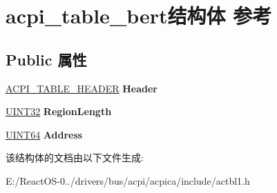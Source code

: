 \hypertarget{structacpi__table__bert}{}\section{acpi\+\_\+table\+\_\+bert结构体 参考}
\label{structacpi__table__bert}
\subsection*{Public 属性}
\begin{DoxyCompactItemize}
\item 
\mbox{\label{structacpi__table__bert_a7ca72bdbc62118d6dca4e513a1c2ba46}} 
\hyperlink{structacpi__table__header}{A\+C\+P\+I\+\_\+\+T\+A\+B\+L\+E\+\_\+\+H\+E\+A\+D\+ER} {\bfseries Header}
\item 
\mbox{\label{structacpi__table__bert_a1dc3d4e4a684b8dfc20c9aa921a5b21d}} 
\hyperlink{_processor_bind_8h_ae1e6edbbc26d6fbc71a90190d0266018}{U\+I\+N\+T32} {\bfseries Region\+Length}
\item 
\mbox{\label{structacpi__table__bert_a2ba0b792ffd1fd7edffb9f27b71c7186}} 
\hyperlink{_processor_bind_8h_a57be03562867144161c1bfee95ca8f7c}{U\+I\+N\+T64} {\bfseries Address}
\end{DoxyCompactItemize}


该结构体的文档由以下文件生成\+:\begin{DoxyCompactItemize}
\item 
E\+:/\+React\+O\+S-\/0../drivers/bus/acpi/acpica/include/actbl1.\+h\end{DoxyCompactItemize}
